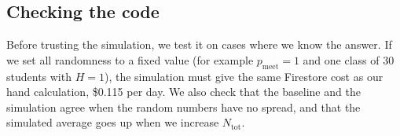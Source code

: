 \documentclass{article}
\begin{document}
\subsection{Checking the code}

Before trusting the simulation, we test it on cases where we know the answer. If we set all randomness to a fixed value (for example $p_{\text{meet}}=1$ and one class of 30 students with $H=1$), the simulation must give the same Firestore cost as our hand calculation, \$0.115 per day. We also check that the baseline and the simulation agree when the random numbers have no spread, and that the simulated average goes up when we increase $N_{\text{tot}}$.
\end{document}
